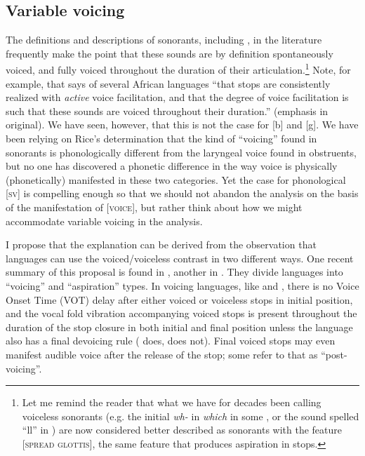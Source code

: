 \documentclass[output=paper]{LSP/langsci}
\begin{document}
\subsection{Variable voicing}

The definitions and descriptions of sonorants, including , in the literature frequently make the point that these sounds are by definition spontaneously voiced, and fully voiced throughout the duration of their articulation.\footnote{Let me remind the reader that what we have for decades been calling voiceless sonorants (e.g. the initial \textit{wh-} in  \textit{which} in some , or the sound spelled ``ll'' in ) are now considered better described as sonorants with the feature [\textsc{spread glottis}], the same feature that produces aspiration in stops.} Note, for example, that \citet[188]{Botma2011} says of several African languages ``that  stops are consistently realized with \textit{active} voice facilitation, and that the degree of voice facilitation is such that these sounds are voiced throughout their duration.'' (emphasis in original). We have seen, however, that this is not the case for  [b] and [g]. We have been relying on Rice's determination that the kind of ``voicing'' found in sonorants is phonologically different from the laryngeal voice found in obstruents, but no one has discovered a phonetic difference in the way voice is physically (phonetically) manifested in these two categories. Yet the case for phonological [\textsc{sv}] is compelling enough so that we should not abandon the analysis on the basis of the manifestation of [\textsc{voice}], but rather think about how we might accommodate variable voicing in the analysis.

I propose that the explanation can be derived from the observation that languages can use the voiced/voiceless contrast in two different ways. One recent summary of this proposal is found in \citet[15--19]{Harris2009}, another in \citet{RingenEtAl2013}. They divide languages into ``voicing'' and ``aspiration'' types. In voicing languages, like  and , there is no Voice Onset Time (VOT) delay after either voiced or voiceless stops in initial position, and the vocal fold vibration accompanying voiced stops is present throughout the duration of the stop closure in both initial and final position unless the language also has a final devoicing rule ( does,  does not). Final voiced stops may even manifest audible voice after the release of the stop; some refer to that as ``post-voicing''.
\end{document}
